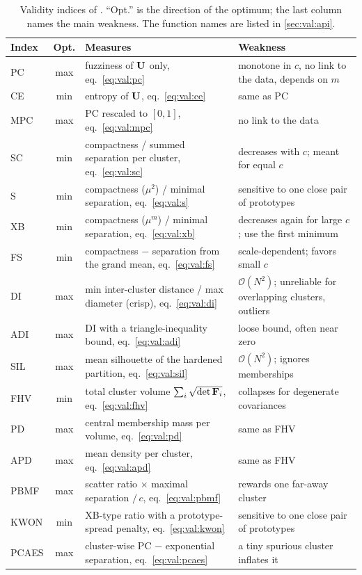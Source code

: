 \begin{table}[htbp]\centering\small
\caption[Validity indices of .]{Validity indices of . ``Opt.'' is the direction of the optimum; the last column names the main weakness. The function names are listed in \cref{sec:val:api}.}
\label{tab:val:indices}
\begin{tabularx}{\textwidth}{@{}l c >{\raggedright\arraybackslash}X >{\raggedright\arraybackslash}X@{}}\toprule
Index & Opt. & Measures & Weakness \\\midrule
PC   & max & fuzziness of $\mathbf{U}$ only, eq.~\eqref{eq:val:pc} & monotone in $c$, no link to the data, depends on $m$ \\
CE   & min & entropy of $\mathbf{U}$, eq.~\eqref{eq:val:ce} & same as PC \\
MPC  & max & PC rescaled to $[0,1]$, eq.~\eqref{eq:val:mpc} & no link to the data \\
SC   & min & compactness / summed separation per cluster, eq.~\eqref{eq:val:sc} & decreases with $c$; meant for equal $c$ \\
S    & min & compactness ($\mu^2$) / minimal separation, eq.~\eqref{eq:val:s} & sensitive to one close pair of prototypes \\
XB   & min & compactness ($\mu^m$) / minimal separation, eq.~\eqref{eq:val:xb} & decreases again for large $c$; use the first minimum \\
FS   & min & compactness $-$ separation from the grand mean, eq.~\eqref{eq:val:fs} & scale-dependent; favors small $c$ \\
DI   & max & min inter-cluster distance / max diameter (crisp), eq.~\eqref{eq:val:di} & $\mathcal{O}(N^2)$; unreliable for overlapping clusters, outliers \\
ADI  & max & DI with a triangle-inequality bound, eq.~\eqref{eq:val:adi} & loose bound, often near zero \\
SIL  & max & mean silhouette of the hardened partition, eq.~\eqref{eq:val:sil} & $\mathcal{O}(N^2)$; ignores memberships \\
FHV  & min & total cluster volume $\sum_i\sqrt{\det\mathbf{F}_i}$, eq.~\eqref{eq:val:fhv} & collapses for degenerate covariances \\
PD   & max & central membership mass per volume, eq.~\eqref{eq:val:pd} & same as FHV \\
APD  & max & mean density per cluster, eq.~\eqref{eq:val:apd} & same as FHV \\
PBMF & max & scatter ratio $\times$ maximal separation $/\,c$, eq.~\eqref{eq:val:pbmf} & rewards one far-away cluster \\
KWON & min & XB-type ratio with a prototype-spread penalty, eq.~\eqref{eq:val:kwon} & sensitive to one close pair of prototypes \\
PCAES & max & cluster-wise PC $-$ exponential separation, eq.~\eqref{eq:val:pcaes} & a tiny spurious cluster inflates it \\\bottomrule
\end{tabularx}
\end{table}

